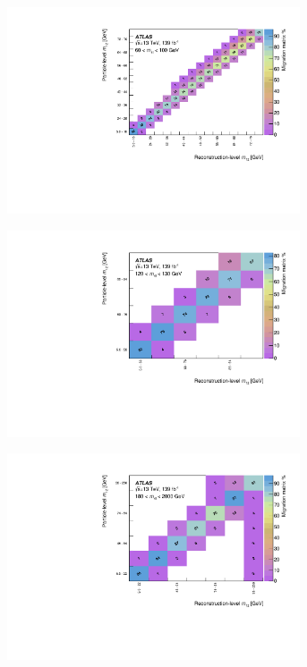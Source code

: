 \begin{figure}[htb]
  \centering
  \begin{subfigure}{.49\textwidth}\centering\includegraphics[width = 0.95\textwidth]{Figures/m4l/UnfoldingStudies/v014_matrices/m12_m4l60-100Matrix.pdf}\end{subfigure}
  \begin{subfigure}{.49\textwidth}\centering\includegraphics[width = 0.95\textwidth]{Figures/m4l/UnfoldingStudies/v014_matrices/m12_m4l120-130Matrix.pdf}\end{subfigure}
  \begin{subfigure}{.49\textwidth}\centering\includegraphics[width = 0.95\textwidth]{Figures/m4l/UnfoldingStudies/v014_matrices/m12_m4l180-2000Matrix.pdf}\end{subfigure}

\end{figure}
